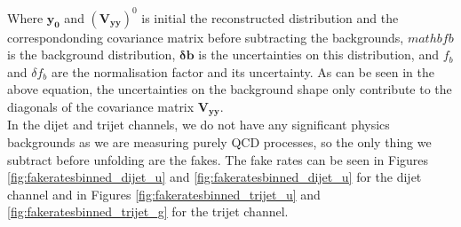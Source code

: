  Where $\mathbf{y_0}$ and $(\mathbf{V_{yy}})^0$ is initial the reconstructed distribution and the correspondonding covariance matrix before subtracting the backgrounds, $mathbf{b}$ is the background distribution, $\mathbf{\delta b}$ is the uncertainties on this distribution, and $f_b$ and $\delta f_b$ are the normalisation factor and its uncertainty. As can be seen in the above equation, the uncertainties on the background shape only contribute to the diagonals of the covariance matrix $\mathbf{V_{yy}}$. \\
  In the dijet and trijet channels, we do not have any significant physics backgrounds as we are measuring purely QCD processes, so the only thing we subtract before unfolding are the fakes. The fake rates can be seen in Figures \ref{fig:fakeratesbinned_dijet_u} and \ref{fig:fakeratesbinned_dijet_u} for the dijet channel and in Figures \ref{fig:fakeratesbinned_trijet_u} and \ref{fig:fakeratesbinned_trijet_g} for the trijet channel.
